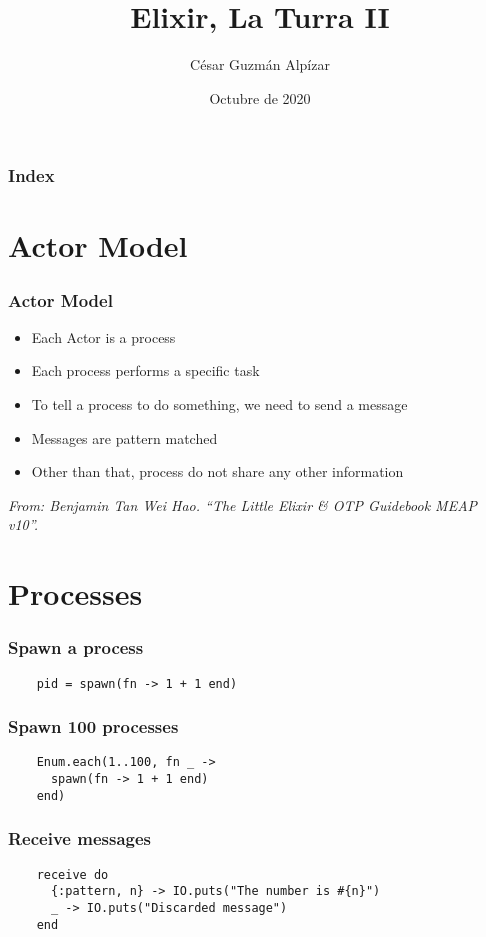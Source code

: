 \documentclass{beamer}
\title{Elixir, La Turra II}
\author{César Guzmán Alpízar}
\institute{Vipera Ibérica}
\date{Octubre de 2020}
\begin{document}
\frame{\titlepage}

\begin{frame}
  \frametitle{Index}
  \tableofcontents
\end{frame}

\section{Actor Model}
\begin{frame}
  \frametitle{Actor Model}
  \begin{itemize}
  \item Each Actor is a process
  \item Each process performs a specific task
  \item To tell a process to do something, we need to send a message
  \item Messages are pattern matched
  \item Other than that, process do not share any other information
  \end{itemize}
  \begin{center}
    \textit{From: Benjamin Tan Wei Hao. “The Little Elixir \& OTP Guidebook MEAP v10”.}
  \end{center}
\end{frame}

\section{Processes}
\begin{frame}[fragile]
  \frametitle{Spawn a process}
\begin{verbatim}
    pid = spawn(fn -> 1 + 1 end)
\end{verbatim}
\end{frame}

\begin{frame}[fragile]
  \frametitle{Spawn 100 processes}
\begin{verbatim}
    Enum.each(1..100, fn _ ->
      spawn(fn -> 1 + 1 end)
    end)
\end{verbatim}
\end{frame}

\begin{frame}[fragile]
  \frametitle{Receive messages}
\begin{verbatim}
    receive do
      {:pattern, n} -> IO.puts("The number is #{n}")
      _ -> IO.puts("Discarded message")
    end
\end{verbatim}
\end{frame}
\end{document}
